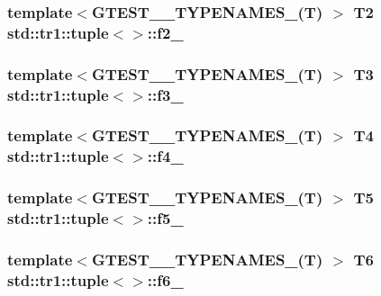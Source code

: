 \subsubsection[{f2\+\_\+}]{\setlength{\rightskip}{0pt plus 5cm}template$<$G\+T\+E\+S\+T\+\_\+\_\+\+T\+Y\+P\+E\+N\+A\+M\+E\+S\+\_\+(\+T) $>$ T2 {\bf std\+::tr1\+::tuple}$<$$>$\+::f2\+\_\+}\label{classstd_1_1tr1_1_1tuple_aaec06c27366502dc332ef96878628f84}
\hypertarget{classstd_1_1tr1_1_1tuple_ad4d3673e0d5c07c392c02e335fe978ff}{}
\subsubsection[{f3\+\_\+}]{\setlength{\rightskip}{0pt plus 5cm}template$<$G\+T\+E\+S\+T\+\_\+\_\+\+T\+Y\+P\+E\+N\+A\+M\+E\+S\+\_\+(\+T) $>$ T3 {\bf std\+::tr1\+::tuple}$<$$>$\+::f3\+\_\+}\label{classstd_1_1tr1_1_1tuple_ad4d3673e0d5c07c392c02e335fe978ff}
\hypertarget{classstd_1_1tr1_1_1tuple_ab662f1051c2302d065796383848db6c4}{}
\subsubsection[{f4\+\_\+}]{\setlength{\rightskip}{0pt plus 5cm}template$<$G\+T\+E\+S\+T\+\_\+\_\+\+T\+Y\+P\+E\+N\+A\+M\+E\+S\+\_\+(\+T) $>$ T4 {\bf std\+::tr1\+::tuple}$<$$>$\+::f4\+\_\+}\label{classstd_1_1tr1_1_1tuple_ab662f1051c2302d065796383848db6c4}
\hypertarget{classstd_1_1tr1_1_1tuple_a32d8cd6f180c0a77d83733fc65423657}{}
\subsubsection[{f5\+\_\+}]{\setlength{\rightskip}{0pt plus 5cm}template$<$G\+T\+E\+S\+T\+\_\+\_\+\+T\+Y\+P\+E\+N\+A\+M\+E\+S\+\_\+(\+T) $>$ T5 {\bf std\+::tr1\+::tuple}$<$$>$\+::f5\+\_\+}\label{classstd_1_1tr1_1_1tuple_a32d8cd6f180c0a77d83733fc65423657}
\hypertarget{classstd_1_1tr1_1_1tuple_a597beab3af3f95c84408491ab14632b0}{}
\subsubsection[{f6\+\_\+}]{\setlength{\rightskip}{0pt plus 5cm}template$<$G\+T\+E\+S\+T\+\_\+\_\+\+T\+Y\+P\+E\+N\+A\+M\+E\+S\+\_\+(\+T) $>$ T6 {\bf std\+::tr1\+::tuple}$<$$>$\+::f6\+\_\+}\label{classstd_1_1tr1_1_1tuple_a597beab3af3f95c84408491ab14632b0}
\hypertarget{classstd_1_1tr1_1_1tuple_a7c28780e616d382833e844f62672c6bc}{}
